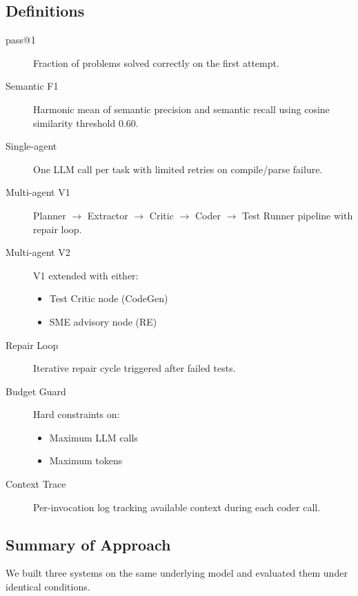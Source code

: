 \documentclass[11pt]{article}
\begin{document}
\subsection{Definitions}

\begin{description}
    \item[pass@1] Fraction of problems solved correctly on the first attempt.
    
    \item[Semantic F1] Harmonic mean of semantic precision and semantic recall using cosine similarity threshold 0.60.
    
    \item[Single-agent] One LLM call per task with limited retries on compile/parse failure.
    
    \item[Multi-agent V1] Planner $\rightarrow$ Extractor $\rightarrow$ Critic $\rightarrow$ Coder $\rightarrow$ Test Runner pipeline with repair loop.
    
    \item[Multi-agent V2] V1 extended with either:
    \begin{itemize}
        \item Test Critic node (CodeGen)
        \item SME advisory node (RE)
    \end{itemize}
    
    \item[Repair Loop] Iterative repair cycle triggered after failed tests.
    
    \item[Budget Guard] Hard constraints on:
    \begin{itemize}
        \item Maximum LLM calls
        \item Maximum tokens
    \end{itemize}
    
    \item[Context Trace] Per-invocation log tracking available context during each coder call.
\end{description}

\subsection{Summary of Approach}

We built three systems on the same underlying model and evaluated them under identical conditions.
\end{document}
